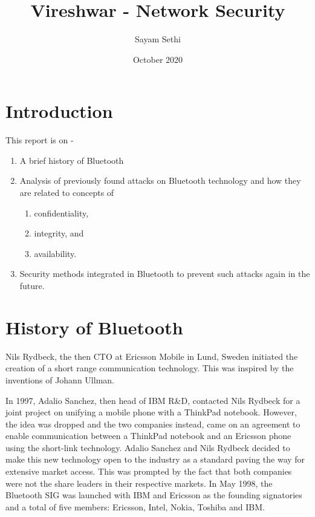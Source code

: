 \documentclass{article}
\title{Vireshwar - Network Security}
\author{Sayam Sethi}
\date{October 2020}
\begin{document}
\maketitle

\section{Introduction}
This report is on -
\begin{enumerate}
    \item A brief history of Bluetooth\texttrademark{}
    \item Analysis of previously found attacks on Bluetooth\texttrademark{} technology and how they are related to concepts of
    \begin{enumerate}
        \item confidentiality,
        \item integrity, and
        \item availability.
    \end{enumerate}
    \item Security methods integrated in Bluetooth\texttrademark{} to prevent such attacks again in the future.
\end{enumerate}


\section{History of Bluetooth\texttrademark{}}

Nils Rydbeck, the then CTO at Ericsson Mobile in Lund, Sweden initiated the creation of a short range communication technology. This was inspired by the inventions of Johann Ullman.\cite{wiki}\par
In 1997, Adalio Sanchez, then head of IBM R\&D, contacted Nils Rydbeck for a joint project on unifying a mobile phone with a ThinkPad notebook. However, the idea was dropped and the two companies instead, came on an agreement to enable communication between a ThinkPad notebook and an Ericsson phone using the short-link technology. Adalio Sanchez and Nils Rydbeck decided to make this new technology open to the industry as a standard paving the way for extensive market access. This was prompted by the fact that both companies were not the share leaders in their respective markets. In May 1998, the Bluetooth\texttrademark{} SIG was launched with IBM and Ericsson as the founding signatories and a total of five members: Ericsson, Intel, Nokia, Toshiba and IBM.\cite{wiki}
\end{document}
